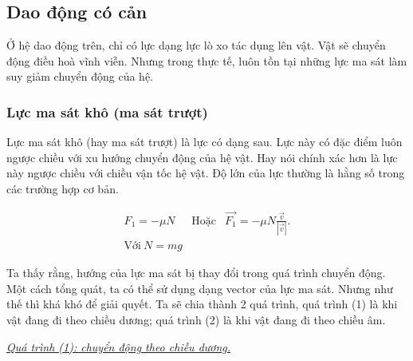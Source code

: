 \documentclass[12pt]{article}
\begin{document}
\subsection{Dao động có cản}
Ở hệ dao động trên, chỉ có lực dạng lực lò xo tác dụng lên vật. Vật sẽ chuyển động điều hoà vĩnh viễn. Nhưng trong thực tế, luôn tồn tại những lực ma sát làm suy giảm chuyển động của hệ. 


\subsubsection{Lực ma sát khô (ma sát trượt)}

Lực ma sát khô (hay ma sát trượt) là lực có dạng sau. Lực này có đặc điểm luôn ngược chiều với xu hướng chuyển động của hệ vật. Hay nói chính xác hơn là lực này ngược chiều với chiều vận tốc hệ vật. Độ lớn của lực thường là hằng số trong các trường hợp cơ bản.

\begin{equation}
\begin{array}{ccc}
    F_1 = - \mu N &\text{Hoặc} & \Vec{F_1} = - \mu N {\displaystyle  \frac{\Vec{v}}{|\Vec{v}|}}. \\
    \text{Với} \ N = mg & &
\end{array}
\label{eq:1.3}
\end{equation}

\begin{figure}[!htb]
    \centering
    \scalebox{0.8}{}
    \caption{}
    \label{fig:1.2}
\end{figure}


Ta thấy rằng, hướng của lực ma sát bị thay đổi trong quá trình chuyển động. Một cách tổng quát, ta có thể sử dụng dạng vector của lực ma sát. Nhưng như thế thì khá khó để giải quyết. Ta sẽ chia thành 2 quá trình, quá trình (1) là khi vật đang đi theo chiều dương; quá trình (2) là khi vật đang đi theo chiều âm.



\vspace{2mm}

\underline{\textit{Quá trình (1): chuyển động theo chiều dương.}}
\vspace{2mm}
\end{document}
